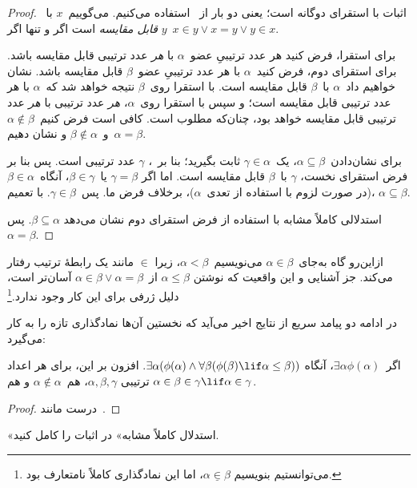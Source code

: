\documentclass[../../../include/open-logic-section]{subfiles}
\begin{document}
\begin{proof}
اثبات با استقرای دوگانه است؛ یعنی دو بار از~
استفاده می‌کنیم. می‌گوییم~$x$ با~$y$ \emph{قابل مقایسه} است اگر و تنها
اگر~$x \in y \lor x=y \lor y \in x$.

برای استقرا، فرض کنید هر عدد ترتیبیِ عضو~$\alpha$ با \emph{هر} عدد
ترتیبی قابل مقایسه باشد. برای استقرای دوم، فرض کنید~$\alpha$ با هر عدد
ترتیبیِ عضو~$\beta$ قابل مقایسه باشد. نشان خواهیم داد~$\alpha$ با~$\beta$
قابل مقایسه است. با استقرا روی~$\beta$ نتیجه خواهد شد که~$\alpha$ با هر
عدد ترتیبی قابل مقایسه است؛ و سپس با استقرا روی~$\alpha$، \emph{هر} عدد
ترتیبی با \emph{هر} عدد ترتیبی قابل مقایسه خواهد بود، چنان‌که مطلوب است.
کافی است فرض کنیم~$\alpha \notin \beta$ و~$\beta \notin \alpha$ و نشان
دهیم~$\alpha=\beta$.

برای نشان‌دادن~$\alpha \subseteq \beta$، یک~$\gamma \in \alpha$ ثابت
بگیرید؛ بنا بر~، $\gamma$ عدد ترتیبی است. پس بنا بر
فرض استقرای نخست، $\gamma$ با~$\beta$ قابل مقایسه است. اما اگر
$\gamma=\beta$ یا~$\beta \in \gamma$، آنگاه~$\beta \in \alpha$ (در صورت
لزوم با استفاده از تعدی~$\alpha$)، برخلاف فرض ما. پس~$\gamma \in \beta$.
با تعمیم، $\alpha \subseteq \beta$.

استدلالی کاملاً مشابه با استفاده از فرض استقرای دوم نشان می‌دهد
$\beta \subseteq \alpha$. پس~$\alpha=\beta$.
\end{proof}\noindent
ازاین‌رو گاه به‌جای~$\alpha \in \beta$ می‌نویسیم~$\alpha<\beta$، زیرا
$\in$ مانند یک رابطهٔ ترتیب رفتار می‌کند. جز آشنایی و این واقعیت که نوشتن
$\alpha \leq \beta$ از~$\alpha \in \beta \lor \alpha=\beta$ آسان‌تر
است، دلیل ژرفی برای این کار وجود ندارد.\footnote{می‌توانستیم بنویسیم
$\alpha \mathrel{\underline{\in}} \beta$، اما این نمادگذاری کاملاً
نامتعارف بود.}

در ادامه دو پیامد سریع از نتایج اخیر می‌آید که نخستین آن‌ها نمادگذاری تازه
را به کار می‌گیرد:

\begin{cor}
اگر~$\exists \alpha\phi(\alpha)$، آنگاه
$\exists \alpha(\phi(\alpha) \land \forall \beta(\phi(\beta) \lif
\alpha \leq \beta))$. افزون بر این، برای هر اعداد ترتیبی
$\alpha,\beta,\gamma$، هم~$\alpha \notin \alpha$ و هم
$\alpha \in \beta \in \gamma \lif \alpha \in \gamma$.
\end{cor}

\begin{proof}
درست مانند~.
\end{proof}

\begin{prob}
«استدلال کاملاً مشابه» در اثبات
 را کامل کنید.
\end{prob}
\end{document}

